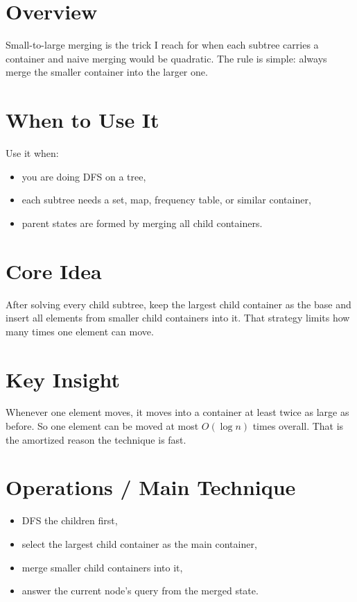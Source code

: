 \section*{Overview}

Small-to-large merging is the trick I reach for when each subtree carries a container and naive merging would be
quadratic. The rule is simple: always merge the smaller container into the larger one.

\section*{When to Use It}

Use it when:

\begin{itemize}
  \item you are doing DFS on a tree,
  \item each subtree needs a set, map, frequency table, or similar container,
  \item parent states are formed by merging all child containers.
\end{itemize}

\section*{Core Idea}

After solving every child subtree, keep the largest child container as the base and insert all elements from smaller
child containers into it. That strategy limits how many times one element can move.

\section*{Key Insight}

Whenever one element moves, it moves into a container at least twice as large as before. So one element can be moved at
most \(O(\log n)\) times overall. That is the amortized reason the technique is fast.

\section*{Operations / Main Technique}

\begin{itemize}
  \item DFS the children first,
  \item select the largest child container as the main container,
  \item merge smaller child containers into it,
  \item answer the current node's query from the merged state.
\end{itemize}

